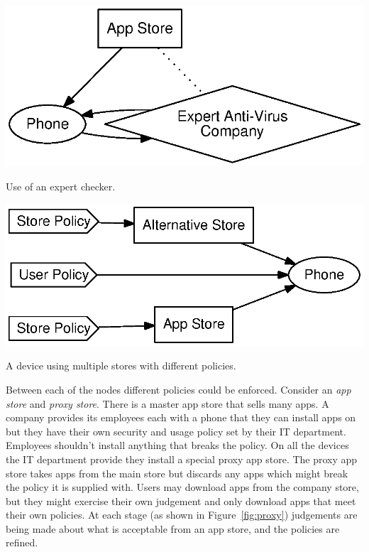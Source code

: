 \documentclass[a4paper]{article}
\begin{document}
\begin{marginfigure}
  
  \includegraphics[width=\marginlength]{img/mcafee.eps}
  \caption{Use of an expert checker.}
\label{fig:mcafee}
\end{marginfigure}

\begin{marginfigure}
  
  \includegraphics[width=\marginlength]{img/altstore.eps}
  \caption{A device using multiple stores with different policies.}
\label{fig:altstore}
\end{marginfigure}

Between each of the nodes different policies could be enforced.  Consider an
\emph{app store} and \emph{proxy store}.  There is a master app store that sells
many apps.  A company provides its employees each with a phone that they can
install apps on but they have their own security and usage policy set by their
IT department.  Employees shouldn't install anything that breaks the policy. On
all the devices the IT department provide they install a special proxy app
store.  The proxy app store takes apps from the main store but discards any apps
which might break the policy it is supplied with.  Users may download apps from
the company store, but they might exercise their own judgement and only download
apps that meet their own policies.  At each stage (as shown in
Figure~\ref{fig:proxy}) judgements are being made about what is acceptable from
an app store, and the policies are refined.
\end{document}
